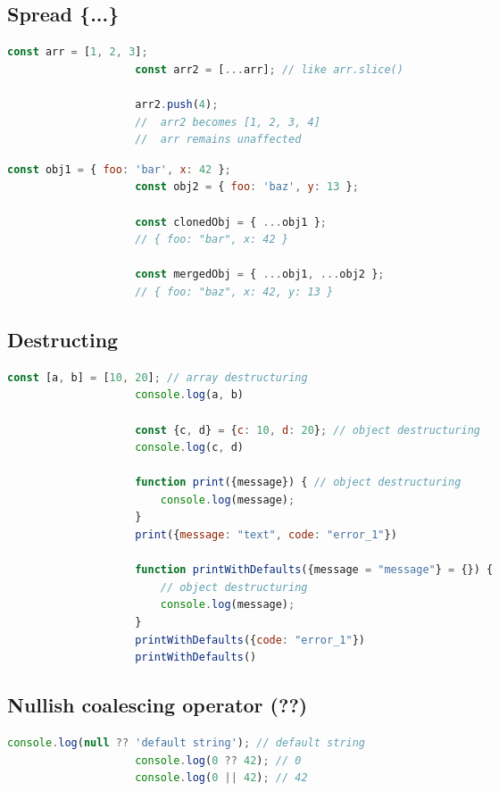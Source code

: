 \documentclass[a4paper, landscape, 8pt]{scrartcl}
\begin{document}
\begin{multicols*}{4}
        \subsection{Spread \{...\}}
        \begin{lstlisting}[language=JavaScript]
                    const arr = [1, 2, 3];
                    const arr2 = [...arr]; // like arr.slice()

                    arr2.push(4);
                    //  arr2 becomes [1, 2, 3, 4]
                    //  arr remains unaffected
        \end{lstlisting}
        \begin{lstlisting}[language=JavaScript]
                    const obj1 = { foo: 'bar', x: 42 };
                    const obj2 = { foo: 'baz', y: 13 };

                    const clonedObj = { ...obj1 };
                    // { foo: "bar", x: 42 }

                    const mergedObj = { ...obj1, ...obj2 };
                    // { foo: "baz", x: 42, y: 13 }
        \end{lstlisting}

        \subsection{Destructing}
        \begin{lstlisting}[language=JavaScript]
                    const [a, b] = [10, 20]; // array destructuring
                    console.log(a, b)

                    const {c, d} = {c: 10, d: 20}; // object destructuring
                    console.log(c, d)

                    function print({message}) { // object destructuring
                        console.log(message);
                    }
                    print({message: "text", code: "error_1"})

                    function printWithDefaults({message = "message"} = {}) {
                        // object destructuring
                        console.log(message);
                    }
                    printWithDefaults({code: "error_1"})
                    printWithDefaults()
        \end{lstlisting}

        \subsection{Nullish coalescing operator (??)}
        \begin{lstlisting}[language=JavaScript]
                    console.log(null ?? 'default string'); // default string
                    console.log(0 ?? 42); // 0
                    console.log(0 || 42); // 42
        \end{lstlisting}


\end{multicols*}
\end{document}
